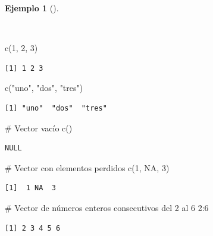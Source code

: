 \documentclass[
  a4paper,
]{scrreport}
\newenvironment{Shaded}{\begin{snugshade}}{\end{snugshade}}
\newcommand{\CommentTok}[1]{\textcolor[rgb]{0.37,0.37,0.37}{#1}}
\newcommand{\ConstantTok}[1]{\textcolor[rgb]{0.56,0.35,0.01}{#1}}
\newcommand{\DecValTok}[1]{\textcolor[rgb]{0.68,0.00,0.00}{#1}}
\newcommand{\FunctionTok}[1]{\textcolor[rgb]{0.28,0.35,0.67}{#1}}
\newcommand{\NormalTok}[1]{\textcolor[rgb]{0.00,0.23,0.31}{#1}}
\newcommand{\SpecialCharTok}[1]{\textcolor[rgb]{0.37,0.37,0.37}{#1}}
\newcommand{\StringTok}[1]{\textcolor[rgb]{0.13,0.47,0.30}{#1}}
\theoremstyle{definition}
\theoremstyle{definition}
\newtheorem{example}{Ejemplo}[chapter]
\theoremstyle{remark}
\begin{document}
\begin{example}[]\protect\hypertarget{exm-construccion-vectores}{}\label{exm-construccion-vectores}

~

\begin{Shaded}
\begin{Highlighting}[]
\FunctionTok{c}\NormalTok{(}\DecValTok{1}\NormalTok{, }\DecValTok{2}\NormalTok{, }\DecValTok{3}\NormalTok{)}
\end{Highlighting}
\end{Shaded}

\begin{verbatim}
[1] 1 2 3
\end{verbatim}

\begin{Shaded}
\begin{Highlighting}[]
\FunctionTok{c}\NormalTok{(}\StringTok{"uno"}\NormalTok{, }\StringTok{"dos"}\NormalTok{, }\StringTok{"tres"}\NormalTok{)}
\end{Highlighting}
\end{Shaded}

\begin{verbatim}
[1] "uno"  "dos"  "tres"
\end{verbatim}

\begin{Shaded}
\begin{Highlighting}[]
\CommentTok{\# Vector vacío}
\FunctionTok{c}\NormalTok{()}
\end{Highlighting}
\end{Shaded}

\begin{verbatim}
NULL
\end{verbatim}

\begin{Shaded}
\begin{Highlighting}[]
\CommentTok{\# Vector con elementos perdidos}
\FunctionTok{c}\NormalTok{(}\DecValTok{1}\NormalTok{, }\ConstantTok{NA}\NormalTok{, }\DecValTok{3}\NormalTok{)}
\end{Highlighting}
\end{Shaded}

\begin{verbatim}
[1]  1 NA  3
\end{verbatim}

\begin{Shaded}
\begin{Highlighting}[]
\CommentTok{\# Vector de números enteros consecutivos del 2 al 6}
\DecValTok{2}\SpecialCharTok{:}\DecValTok{6}
\end{Highlighting}
\end{Shaded}

\begin{verbatim}
[1] 2 3 4 5 6
\end{verbatim}

\end{example}
\end{document}
